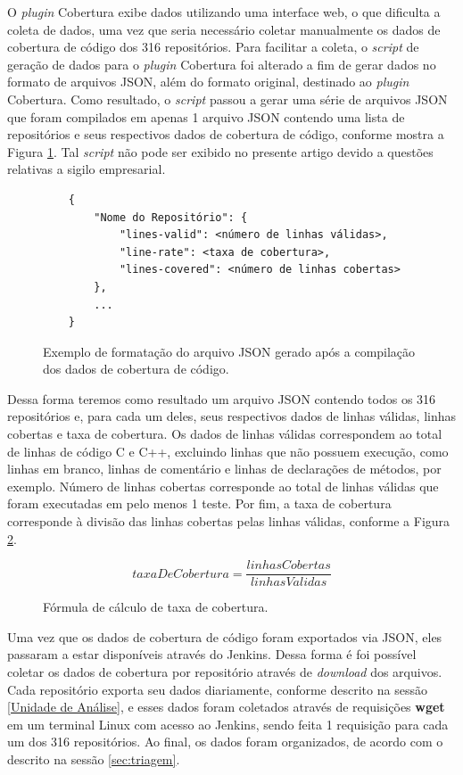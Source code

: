 \documentclass[11.5pt]{article}
\begin{document}
O \textit{plugin} Cobertura exibe dados utilizando uma interface web, o que dificulta a coleta de
dados, uma vez que seria necessário coletar manualmente os dados de cobertura de código dos 316
repositórios.
Para facilitar a coleta, o \textit{script} de geração de dados para o \textit{plugin} Cobertura
foi alterado a fim de gerar dados no formato de arquivos JSON, além do formato original, destinado
ao \textit{plugin} Cobertura.
Como resultado, o \textit{script} passou a gerar uma série de arquivos JSON que foram compilados em
apenas 1 arquivo JSON contendo uma lista de repositórios e seus respectivos dados de cobertura de
código, conforme mostra a Figura \ref{fig:formatoJsonCoverage}.
Tal \textit{script} não pode ser exibido no presente artigo devido a questões relativas a sigilo
empresarial.


\begin{figure}[ht]
\caption{Exemplo de formatação do arquivo JSON gerado após a compilação dos dados de cobertura
de código.}
\label{fig:formatoJsonCoverage}
\small
\begin{verbatim}
    {
        "Nome do Repositório": {
            "lines-valid": <número de linhas válidas>,
            "line-rate": <taxa de cobertura>,
            "lines-covered": <número de linhas cobertas>
        },
        ...
    }
\end{verbatim}
\end{figure}

Dessa forma teremos como resultado um arquivo JSON contendo todos os 316 repositórios e, para cada
um deles, seus respectivos dados de linhas válidas, linhas cobertas e taxa de cobertura.
Os dados de linhas válidas correspondem ao total de linhas de código C e C++, excluindo linhas que
não possuem execução, como linhas em branco, linhas de comentário e linhas de declarações de
métodos, por exemplo. Número de linhas cobertas corresponde ao total de linhas válidas que foram
executadas em pelo menos 1 teste. Por fim, a taxa de cobertura corresponde à divisão das linhas
cobertas pelas linhas válidas, conforme a Figura \ref{fig:formulaTaxaDeCobertura}.

\begin{figure}[ht]
\caption{Fórmula de cálculo de taxa de cobertura.}
\label{fig:formulaTaxaDeCobertura}
    \[ taxaDeCobertura = \frac{linhasCobertas}{linhasValidas} \]
\end{figure}

Uma vez que os dados de cobertura de código foram exportados via JSON, eles passaram a estar
disponíveis através do Jenkins.
Dessa forma é foi possível coletar os dados de cobertura por repositório através de
\textit{download} dos arquivos.
Cada repositório exporta seu dados diariamente, conforme descrito na sessão
\ref{Unidade de Análise}, e esses dados foram coletados através de requisições \textbf{wget}
em um terminal Linux com acesso ao Jenkins, sendo feita 1 requisição para cada um dos 316
repositórios.
Ao final, os dados foram organizados, de acordo com o descrito na sessão \ref{sec:triagem}.
\end{document}
